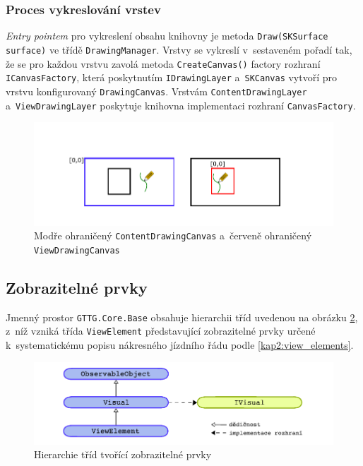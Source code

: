 \subsubsection*{Proces vykreslování vrstev}
\textit{Entry pointem} pro vykreslení obsahu knihovny je metoda \texttt{Draw(SKSurface surface)} ve třídě \texttt{DrawingManager}. Vrstvy se vykreslí v~sestaveném pořadí tak, že se pro každou vrstvu zavolá metoda \texttt{CreateCanvas()} factory rozhraní \linebreak\texttt{ICanvasFactory}, která poskytnutím \texttt{IDrawingLayer} a~\texttt{SKCanvas} vytvoří pro vrstvu konfigurovaný \texttt{DrawingCanvas}. Vrstvám \texttt{ContentDrawingLayer} \linebreak a~\texttt{ViewDrawingLayer} poskytuje knihovna implementaci rozhraní \texttt{CanvasFactory}.

\begin{figure}[!hbt]
	\includegraphics[width=\textwidth]{../img/kap4_gttg-core_drawing_canvases}
	\caption{Modře ohraničený \texttt{ContentDrawingCanvas} a~červeně ohraničený \texttt{ViewDrawingCanvas}}
	\label{fig:kap4:gttg-core-base_canvases}
\end{figure}

\newpage
\subsection{Zobrazitelné prvky}
Jmenný prostor \texttt{GTTG.Core.Base} obsahuje hierarchii tříd uvedenou na obrázku \ref{fig:kap4:gttg-core-base_class_hierarchy}, z~níž vzniká třída \texttt{ViewElement} představující zobrazitelné prvky určené k~systematickému popisu nákresného jízdního řádu podle \ref{kap2:view_elements}.

\begin{figure}[!hbt]
	\includegraphics[width=\textwidth]{../img/kap4_gttg-core-base_class_hierarchy}
	\caption{Hierarchie tříd tvořící zobrazitelné prvky}
	\label{fig:kap4:gttg-core-base_class_hierarchy}
\end{figure}

